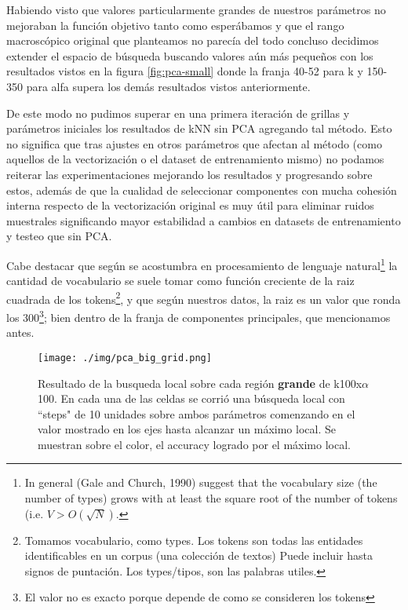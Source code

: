 Habiendo visto que valores particularmente grandes de nuestros parámetros no mejoraban la función objetivo tanto como esperábamos y que el rango macroscópico original que planteamos no parecía del todo concluso decidimos extender el espacio de búsqueda buscando valores aún más pequeños con los resultados vistos en la figura \ref{fig:pca-small} donde la franja 40-52 para k y 150-350 para alfa supera los demás resultados vistos anteriormente.

De este modo no pudimos superar en una primera iteración de grillas y parámetros iniciales los resultados de kNN sin PCA agregando tal método. Esto no significa que tras ajustes en otros parámetros que afectan al método (como aquellos de la vectorización o el dataset de entrenamiento mismo) no podamos reiterar las experimentaciones mejorando los resultados y progresando sobre estos, además de que la cualidad de seleccionar componentes con mucha cohesión interna respecto de la vectorización original es muy útil para eliminar ruidos muestrales significando mayor estabilidad a cambios en datasets de entrenamiento y testeo que sin PCA.

Cabe destacar que según se acostumbra en procesamiento de
lenguaje\cite{LP} natural\footnote{In general (Gale and Church, 1990)
  suggest that the vocabulary size (the number of types) grows with at
  least the square root of the number of tokens (i.e.
  $V > O(\sqrt{N})$.} la cantidad de vocabulario se suele tomar como
función creciente de la raiz cuadrada de los tokens\footnote{Tomamos
  vocabulario, como types. Los tokens son todas las entidades
  identificables en un corpus (una colección de textos) Puede incluir
  hasta signos de puntación. Los types/tipos, son las palabras
  utiles.}, y que según nuestros datos, la raiz es un valor que ronda
los 300\footnote{El valor no es exacto porque depende de como se
  consideren los tokens}; bien dentro de la franja de componentes
principales, que mencionamos antes.

\begin{figure}[h]
  \texttt{[image: ./img/pca\_big\_grid.png]}
  \centering
  \caption{Resultado de la busqueda local sobre cada región
    \textbf{grande} de k100x$\alpha$100. En cada una de las celdas se corrió una búsqueda local con ``steps" de 10 unidades sobre ambos parámetros comenzando en el valor mostrado en los ejes hasta alcanzar un
    máximo local. Se muestran sobre el color, el accuracy logrado por el máximo local.}
  \label{fig:pca-big}
\end{figure}


